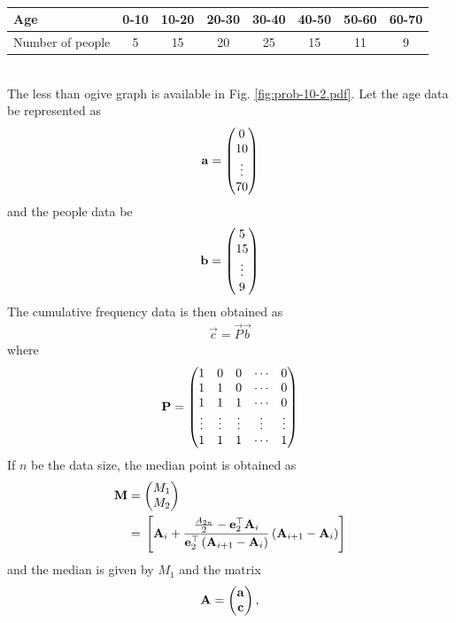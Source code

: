 \documentclass[journal,12pt,twocolumn]{IEEEtran}
\begin{document}
\begin{enumerate}
\begin{table}[!hb]
{%
    \begin{tabular}{|l|c|c|c|c|c|c|c|}
        \hline
        Age & 0-10 & 10-20 & 20-30 & 30-40 & 40-50 & 50-60 & 60-70  \\
        \hline
        Number of people & 5 & 15 & 20 & 25 & 15 & 11 & 9\\
        \hline
    \end{tabular}
    }
			\caption{}
			\label{table:prob-10-2}
		\end{table}
		\\
		\solution  The less than ogive graph is available in Fig. 
	  \ref{fig:prob-10-2.pdf}.  Let the age data be represented as
		\begin{align}
			\mathbf{a} = \begin{pmatrix}0 \\ 10 \\ \vdots \\ 70\end{pmatrix}
		\end{align}
		and the people data be 
		\begin{align}
			\mathbf{b} = \begin{pmatrix}5 \\ 15 \\ \vdots \\ 9\end{pmatrix}
		\end{align}
		The  cumulative frequency data is then obtained as 
		\begin{align}
			\vec{c} = \vec{P} \vec{b}
		\end{align}
		where 
		\begin{align}
			\mathbf{P} =\begin{pmatrix}
				1 & 0 & 0 &\cdots & 0
			\\
				1 & 1 &  0 & \cdots & 0
			\\
				1 & 1 & 1 &\cdots & 0
			\\
			\vdots & 
			\vdots & 
			\vdots & 
			\vdots & 
			\vdots  
			\\
				1 & 1 & 1 &\cdots & 1 
			\\
			\end{pmatrix}
		\end{align}
		If $n$ be the data size,  the median point is obtained as 
		\begin{align}
			\mathbf{M} &= \begin{pmatrix}M_1 \\ M_2\end{pmatrix}
			\\
			&={}\left[\mathbf{A}_i + \frac{\frac{A_{2n}}{2} -\mathbf{e}_2^{\top}  \mathbf{A}_i }{\mathbf{e}_2^{\top}\left(\mathbf{A}_{i+1} -\mathbf{A}_i \right)}\left(\mathbf{A}_{i+1} -\mathbf{A}_i \right)\right]
		\end{align}
		and the median is given by $M_1$ and the matrix
		\begin{align}
			\vec{A} = \myvec{\vec{a} \\ \vec{c}},

\end{align}
\end{enumerate}
\end{document}
